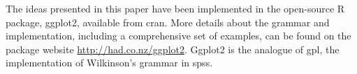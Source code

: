 The ideas presented in this paper have been implemented in the open-source R package, ggplot2, available from {\sc cran}. More details about the grammar and implementation, including a comprehensive set of examples, can be found on the package website \url{http://had.co.nz/ggplot2}.  Ggplot2 is the analogue of {\sc gpl}, the implementation of Wilkinson's grammar in {\sc spss}.
% 
% 
%
% 

